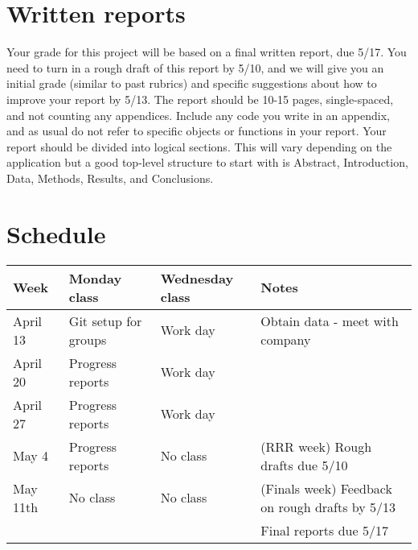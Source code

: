 \documentclass[11pt, oneside]{article}   	%
\begin{document}
\section{Written reports}
Your grade for this project will be based on a final written report, due 5/17. You need to turn in a rough draft of this report by  5/10, and we will give you an initial grade (similar to past rubrics) and specific suggestions about how to improve your report by 5/13. The report should be 10-15 pages, single-spaced, and not counting any appendices. Include any code you write in an appendix, and as usual do not refer to specific objects or functions in your report. Your report should be divided into logical sections. This will vary depending on the application but a good top-level structure to start with is Abstract, Introduction, Data, Methods, Results, and Conclusions.

\section{Schedule}

\begin{tabular}{l|l|l|l}
Week & Monday class & Wednesday class & Notes\\
\hline
April 13 & Git setup for groups & Work day & Obtain data - meet with company\\
April 20 & Progress reports & Work day &\\
April 27 & Progress reports & Work day &\\
May 4 & Progress reports & No class & (RRR week) Rough drafts due 5/10\\
May 11th & No class & No class & (Finals week) Feedback on rough drafts by 5/13\\
& & & Final reports due 5/17
\end{tabular}
\end{document}
